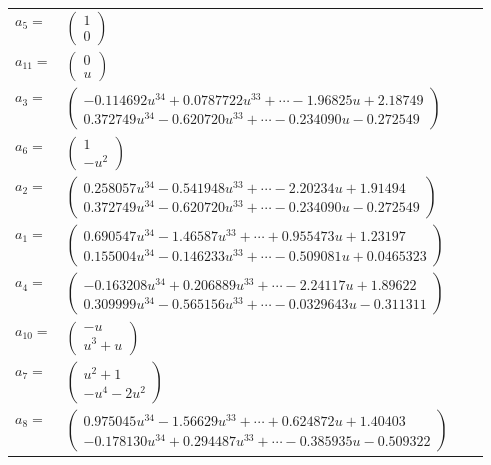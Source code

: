 \documentclass[1p]{elsarticle_modified}
\theoremstyle{definition}
\begin{document}
\begin{tabular}{m{7pt} m{180pt} m{7pt} m{180pt} }
\flushright $a_{5}=$&$\begin{pmatrix}1\\0\end{pmatrix}$ \\
\flushright $a_{11}=$&$\begin{pmatrix}0\\u\end{pmatrix}$ \\
\flushright $a_{3}=$&$\begin{pmatrix}-0.114692 u^{34}+0.0787722 u^{33}+\cdots-1.96825 u+2.18749\\0.372749 u^{34}-0.620720 u^{33}+\cdots-0.234090 u-0.272549\end{pmatrix}$ \\
\flushright $a_{6}=$&$\begin{pmatrix}1\\- u^2\end{pmatrix}$ \\
\flushright $a_{2}=$&$\begin{pmatrix}0.258057 u^{34}-0.541948 u^{33}+\cdots-2.20234 u+1.91494\\0.372749 u^{34}-0.620720 u^{33}+\cdots-0.234090 u-0.272549\end{pmatrix}$ \\
\flushright $a_{1}=$&$\begin{pmatrix}0.690547 u^{34}-1.46587 u^{33}+\cdots+0.955473 u+1.23197\\0.155004 u^{34}-0.146233 u^{33}+\cdots-0.509081 u+0.0465323\end{pmatrix}$ \\
\flushright $a_{4}=$&$\begin{pmatrix}-0.163208 u^{34}+0.206889 u^{33}+\cdots-2.24117 u+1.89622\\0.309999 u^{34}-0.565156 u^{33}+\cdots-0.0329643 u-0.311311\end{pmatrix}$ \\
\flushright $a_{10}=$&$\begin{pmatrix}- u\\u^3+u\end{pmatrix}$ \\
\flushright $a_{7}=$&$\begin{pmatrix}u^2+1\\- u^4-2 u^2\end{pmatrix}$ \\
\flushright $a_{8}=$&$\begin{pmatrix}0.975045 u^{34}-1.56629 u^{33}+\cdots+0.624872 u+1.40403\\-0.178130 u^{34}+0.294487 u^{33}+\cdots-0.385935 u-0.509322\end{pmatrix}$ \\

\end{tabular}
\end{document}
